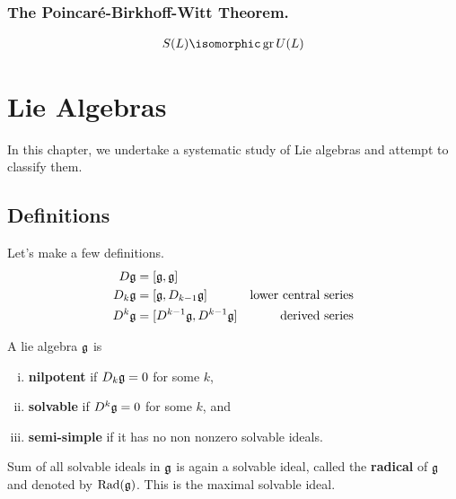 \subsection{The Poincar\'e-Birkhoff-Witt Theorem.}
\label{sub:the_poincar'e_birkhoff_witt_theorem_}


\begin{theorem}
    \begin{align}
        S(L) \isomorphic \gr U(L)
    \end{align}
\end{theorem}




\chapter{Lie Algebras}
\label{cha:lie_algebras}
In this chapter, we undertake a systematic study of Lie algebras and attempt to classify them.

\section{Definitions}

Let's make a few definitions.
\begin{align}
    D\mathfrak{g} &= [\mathfrak{g}, \mathfrak{g}] &\text{}\\
    D_k\mathfrak{g} &= [\mathfrak{g}, D_{k-1}\mathfrak{g}] &\text{lower central series}\\
    D^k\mathfrak{g} &= [D^{k-1}\mathfrak{g}, D^{k-1}\mathfrak{g}] &\text{derived series}
\end{align}

\begin{definition} A lie algebra $\mathfrak{g}$ is 
    \begin{enumerate}[(i)]
        \makethislistcompact
        \item \textbf{nilpotent} if $D_k\mathfrak{g}=0$ for some $k$,
        \item \textbf{solvable} if $D^k\mathfrak{g}=0$ for some $k$, and
        \item \textbf{semi-simple} if it has no non nonzero solvable ideals.
    \end{enumerate}
\end{definition}

\begin{definition}[Radical]
    Sum of all solvable ideals in $\mathfrak{g}$ is again a solvable ideal, called the \textbf{radical} of $\mathfrak{g}$ and denoted by $\operatorname{Rad}(\mathfrak{g})$. This is the maximal solvable ideal.
\end{definition}

